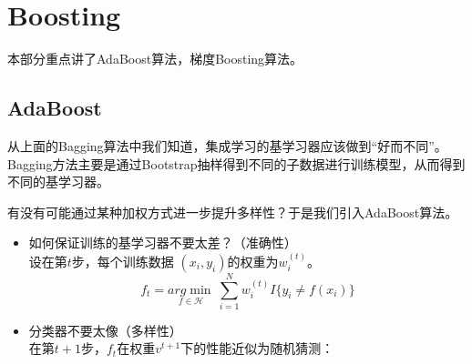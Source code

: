 \documentclass[twoside]{article}
\begin{document}
\section*{Boosting}
本部分重点讲了AdaBoost算法，梯度Boosting算法。
\subsection*{AdaBoost}
从上面的Bagging算法中我们知道，集成学习的基学习器应该做到“好而不同”。Bagging方法主要是通过Bootstrap抽样得到不同的子数据进行训练模型，从而得到不同的基学习器。

有没有可能通过某种加权方式进一步提升多样性？于是我们引入AdaBoost算法。
\begin{itemize}
    \item 如何保证训练的基学习器不要太差？（准确性）\\
    设在第$t$步，每个训练数据 $(x_i,y_i)$的权重为$w_i^{(t)}$。
    \begin{equation*}
        f_t=\underset{f \in \mathcal{H}}{arg\min}\ \sum_{i=1}^N w_i^{(t)} I\{y_i \neq f(x_i)\}
    \end{equation*}
    \item 分类器不要太像（多样性）\\
    在第$t+1$步，$f_t$在权重$v^{t+1}$下的性能近似为随机猜测：


\end{itemize}
\end{document}
